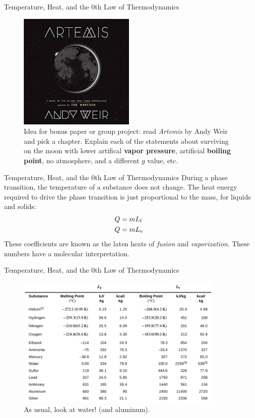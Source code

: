\documentclass{beamer}
\begin{document}
\begin{frame}{Temperature, Heat, and the 0th Law of Thermodynamics}
\begin{figure}
\centering
\includegraphics[width=0.5\textwidth]{figures/artemis.jpg}
\caption{\label{fig:artemis} Idea for bonus paper or group project: read \textit{Artemis} by Andy Weir and pick a chapter.  Explain each of the statements about surviving on the moon with lower artifical \textbf{vapor pressure}, artificial \textbf{boiling point}, no atmosphere, and a different $g$ value, etc.}
\end{figure}
\end{frame}

\begin{frame}{Temperature, Heat, and the 0th Law of Thermodynamics}
\small
During a phase transition, the temperature of a substance does not change.  The heat energy required to drive the phase transition is just proportional to the mass, for liquids and solids:
\begin{align}
Q &= m L_{\rm f} \\
Q &= m L_{\rm v}
\end{align}
These coefficients are known as the laten heats of \textit{fusion} and \textit{vaporization}.  These numbers have a molecular interpretation.
\end{frame}

\begin{frame}{Temperature, Heat, and the 0th Law of Thermodynamics}
\begin{figure}
\centering
\includegraphics[width=0.9\textwidth]{figures/lvlf.png}
\caption{\label{fig:lvlf} As usual, look at water! (and aluminum).}
\end{figure}
\end{frame}
\end{document}
